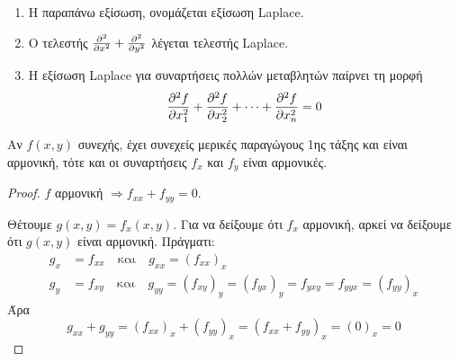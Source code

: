         \begin{rem}
        \item {}
            \begin{enumerate}
                \item Η παραπάνω εξίσωση, ονομάζεται εξίσωση Laplace.
                \item Ο τελεστής $ \pdv[2]{}{x} + \pdv[2]{}{y} $ λέγεται τελεστής 
                    Laplace.
                \item Η εξίσωση Laplace για συναρτήσεις πολλών μεταβλητών παίρνει τη 
                    μορφή
                    \[
                        \pdv[2]{f}{x_{1}} + \pdv[2]{f}{x_{2}} + \cdots + 
                        \pdv[2]{f}{x_{n}}=0 
                     \] 
            \end{enumerate}
        \end{rem}

        \begin{prop}
        \item {}
            Αν $ f(x,y) $ συνεχής, έχει συνεχείς μερικές παραγώγους 1ης τάξης 
            και είναι αρμονική, τότε και οι συναρτήσεις $ f_{x} $ και $ f_{y} $
            είναι αρμονικές. 
        \end{prop}
        \begin{proof}
        \item {}
            $f$ αρμονική $ \Rightarrow f_{xx}+f_{yy}=0 $.

            Θέτουμε $ g(x,y)=f_{x}(x,y) $. Για να δείξουμε ότι $ f_{x} $ αρμονική, 
            αρκεί να δείξουμε ότι $ g(x,y) $ είναι αρμονική. Πράγματι:
            \begin{align*}
                g_{x} &= f_{xx} \quad \text{και} \quad g_{xx} = (f_{xx})_{x} \\ 
                g_{y} &= f_{xy} \quad \text{και} \quad g_{yy} = (f_{xy})_{y} =
                (f_{yx})_{y} = f_{yxy} = f_{yyx} = (f_{yy})_{x}
            \end{align*}
            Άρα 
            \[
                g_{xx}+g_{yy} = (f_{xx})_{x} + (f_{yy})_{x} = 
                (f_{xx}+f_{yy})_{x}= (0)_{x} =0
             \] 
        \end{proof}

